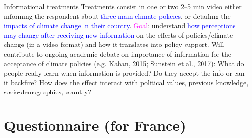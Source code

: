 
\begin{frame}{Informational treatments}
\bbs
\ip Treatments consist in one or two 2--5 min video either informing the respondent about
\textcolor{blue}{three main climate policies}, or detailing the \textcolor{blue}{impacts of climate change in their country}.
\ip \textcolor{magenta}{Goal}: understand \textcolor{blue}{how perceptions may change after
receiving new information} on the effects of policies/climate change (in a video
format) and how it translates into policy support.
\ip Will contribute to ongoing academic debate on importance of information for the acceptance of climate policies (e.g. Kahan, 2015; Sunstein et al., 2017):
\bbvs
\ip What do people really learn when information is provided?
\ip Do they accept the info or can it backfire?
\ip How does the effect interact with political values, previous knowledge, socio-demographics, country?
\ee
\ee
\end{frame}

\section{Questionnaire (for France)}

